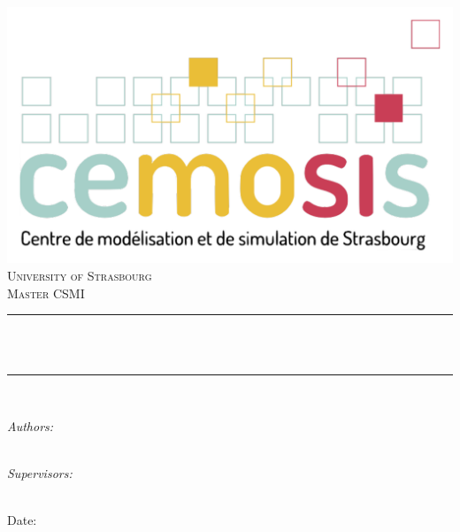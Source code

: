 \begin{titlepage}

\newcommand{\HRule}{\rule{\linewidth}{0.5mm}} %

\begin{center} %

\includegraphics[width = 0.5\linewidth]{images/logo-cemosis.pdf}\\[1.5cm] 

\textsc{\Large University of Strasbourg}\\[0.5cm] 
\textsc{\large Master CSMI}\\[0.95cm] 


\HRule \\[0.4cm]
{ \huge \bfseries \reporttitle}\\ %
\HRule \\[1.5cm]
\end{center}

\begin{flushleft} \large
	\begin{minipage}{0.4\hsize}
		\textit{Authors:}\\
		\reportauthorOne\\
		\reportauthorTwo
	\end{minipage} \hfill 
	\begin{minipage}{0.4\hsize}
		\textit{Supervisors:}\\
		\reportsupervisorOne\\
		\reportsupervisorTwo
	\end{minipage}
\end{flushleft}
\vspace{4cm}
\makeatletter
Date: \@date 

\vfill %



\makeatother


\end{titlepage}

